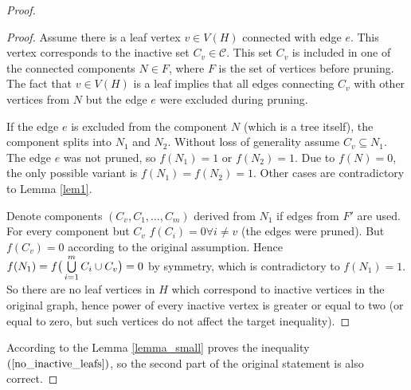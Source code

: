 \documentclass[11pt, tightenlines, twoside, onecolumn, nofloats, nobibnotes, nofootinbib, superscriptaddress, noshowpacks, centertags]{revtex4}
\begin{document}
\begin{proof}
\begin{proof}
         Assume there is a leaf vertex $v\in V(H)$ connected with edge $e$. This vertex corresponds to the inactive set $C_v\in\mathcal{C}$. This set $C_v$ is included in one of the connected components $N\in F$, where $F$ is the set of vertices before pruning. The fact that $v \in V(H)$ is a leaf implies that all edges connecting $C_v$ with other vertices from $N$ but the edge $e$ were excluded during pruning.
         
         If the edge $e$ is excluded from the component $N$ (which is a tree itself), the component splits into $N_1$ and $N_2$. Without loss of generality assume $C_v\subseteq N_1$. The edge $e$ was not pruned, so $f(N_1)=1$ or $f(N_2)=1$. Due to $f(N) = 0$, the only possible variant is $f(N_1) = f(N_2) = 1$. Other cases are contradictory to Lemma \ref{lem1}.
         
         Denote components $(C_v,C_1,\ldots,C_m)$ derived from $N_1$ if edges from $F'$ are used. For every component but $C_v$ $f(C_i)=0 \forall i \neq v$ (the edges were pruned). But $f(C_v)=0$ according to the original assumption. Hence $f(N_1) = f\big(\bigcup\limits_{i=1}^{m} C_i \cup C_v\big) = 0$ by symmetry, which is contradictory to $f(N_1) = 1$. So there are no leaf vertices in $H$ which correspond to inactive vertices in the original graph, hence power of every inactive vertex is greater or equal to two (or equal to zero, but such vertices do not affect the target inequality).
    \end{proof}

    According to the Lemma \ref{lemma_small} proves the inequality $(\ref{no_inactive_leafs})$, so the second part of the original statement is also correct.
\end{proof}
\end{document}
